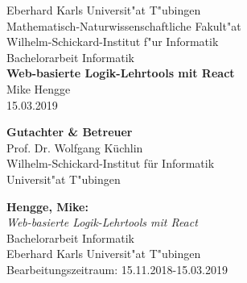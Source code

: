 \documentclass[twoside,12pt,a4paper]{report}
\begin{document}
 
\begin{titlepage}
 \begin{center}
  {\LARGE Eberhard Karls Universit"at T"ubingen}\\
  {\large Mathematisch-Naturwissenschaftliche Fakult"at \\
Wilhelm-Schickard-Institut f"ur Informatik\\[4cm]}
  {\huge Bachelorarbeit Informatik\\[2cm]}
  {\Large\bf Web-basierte Logik-Lehrtools mit React\\[1.5cm]}
 {\large Mike Hengge}\\[0.5cm]
15.03.2019\\[3cm]
\begin{center}{\small\bf Gutachter \& Betreuer}\\[0.5cm]
{\large Prof. Dr. Wolfgang Küchlin}\\
  {\footnotesize Wilhelm-Schickard-Institut f\"ur Informatik\\
	Universit"at T"ubingen}	\end{center}
	
  \end{center}
\end{titlepage}


\thispagestyle{empty}
\vspace*{\fill}
\begin{minipage}{11.2cm}
\textbf{Hengge, Mike:}\\
\emph{Web-basierte Logik-Lehrtools mit React}\\ Bachelorarbeit Informatik\\
Eberhard Karls Universit"at T"ubingen\\
Bearbeitungszeitraum: 15.11.2018-15.03.2019
\end{minipage}
\newpage


\setcounter{page}{1}

\end{document}
